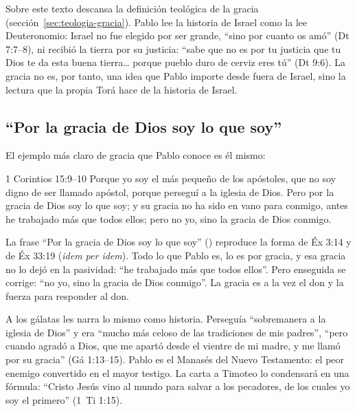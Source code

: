 Sobre este texto descansa la definición teológica de la gracia (sección~\ref{sec:teologia-gracia}). Pablo lee la historia de Israel como la lee Deuteronomio: Israel no fue elegido por ser grande, ``sino por cuanto \SENOR{} os amó'' (Dt 7:7--8), ni recibió la tierra por su justicia: ``sabe que no es por tu justicia que \SENOR{} tu Dios te da esta buena tierra\ldots{} porque pueblo duro de cerviz eres tú'' (Dt 9:6). La gracia no es, por tanto, una idea que Pablo importe desde fuera de Israel, sino la lectura que la propia Torá hace de la historia de Israel.


\subsection{“Por la gracia de Dios soy lo que soy”}
El ejemplo más claro de gracia que Pablo conoce es él mismo:

\begin{verso}{1 Corintios 15:9–10}
Porque yo soy el más pequeño de los apóstoles, que no soy digno de ser llamado apóstol, porque perseguí a la iglesia de Dios. Pero por la gracia de Dios soy lo que soy; y su gracia no ha sido en vano para conmigo, antes he trabajado más que todos ellos; pero no yo, sino la gracia de Dios conmigo.
\end{verso}

La frase ``Por la gracia de Dios soy lo que soy'' () reproduce la forma de Éx 3:14 y de Éx 33:19 (\emph{idem per idem}). Todo lo que Pablo es, lo es por gracia, y esa gracia no lo dejó en la pasividad: ``he trabajado más que todos ellos''. Pero enseguida se corrige: ``no yo, sino la gracia de Dios conmigo''. La gracia es a la vez el don y la fuerza para responder al don.

A los gálatas les narra lo mismo como historia. Perseguía ``sobremanera a la iglesia de Dios'' y era ``mucho más celoso de las tradiciones de mis padres'', ``pero cuando agradó a Dios, que me apartó desde el vientre de mi madre, y me llamó por su gracia'' (Gá 1:13--15). Pablo es el Manasés del Nuevo Testamento: el peor enemigo convertido en el mayor testigo. La carta a Timoteo lo condensará en una fórmula: ``Cristo Jesús vino al mundo para salvar a los pecadores, de los cuales yo soy el primero'' (1~Ti 1:15).

